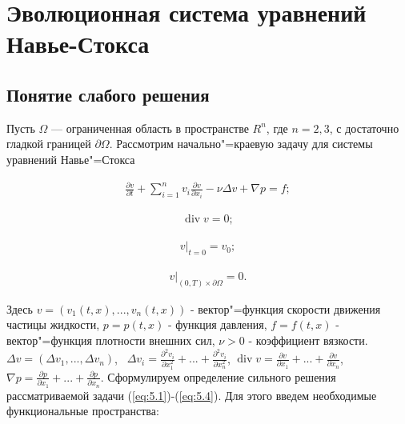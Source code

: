 \section{Эволюционная система уравнений \\Навье-Стокса}
\subsection {Понятие слабого решения}
Пусть $\Omega$ --- ограниченная область в пространстве $R^n$, где $n=2, 3$, с достаточно гладкой границей $\partial\Omega$.
Рассмотрим начально"=краевую задачу для системы уравнений Навье"=Стокса

\begin{equation}\label{eq:5.1}
    \begin{gathered}
        \frac{\partial v}{\partial t}+\sum_{i=1}^nv_i\frac{\partial v}{\partial x_i}-\nu\Delta v+\nabla p=f;
    \end{gathered}
\end{equation}

\begin{equation}\label{eq:5.2}
    \begin{gathered}
        \operatorname{div} v=0;
    \end{gathered}
\end{equation}

\begin{equation}\label{eq:5.3}
    \begin{gathered}
        v|_{t=0}=v_0;
    \end{gathered}
\end{equation}

\begin{equation}\label{eq:5.4}
    \begin{gathered}
        v|_{(0, T)\times\partial\Omega}=0.
    \end{gathered}
\end{equation}

Здесь $v=(v_1(t, x),...,v_n(t, x))$ - вектор"=функция скорости движения частицы жидкости, $p=p(t, x)$ - функция давления,
$f=f(t, x)$ - вектор"=функция плотности внешних сил, $\nu>0$ - коэффициент вязкости.
$\Delta v=(\Delta v_1,...,\Delta v_n)$, \ $\Delta v_i= \frac{\partial^2 v_i}{\partial x_1^2}+...+\frac{\partial^2 v_i}{\partial x_n^2}$,
$\operatorname{div} v= \frac{\partial v}{\partial x_1}+...+\frac{\partial v}{\partial x_n}$,
$\nabla p=\frac{\partial p}{\partial x_1}+...+\frac{\partial p}{\partial x_n}$.
Сформулируем определение сильного решения рассматриваемой задачи (\ref{eq:5.1})-(\ref{eq:5.4}).
Для этого введем необходимые функциональные пространства:

